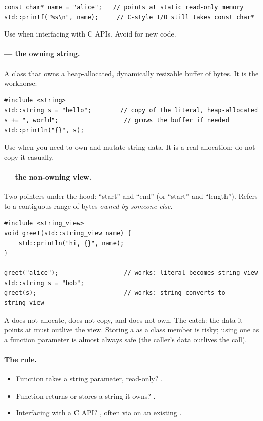 \begin{lstlisting}
const char* name = "alice";   // points at static read-only memory
std::printf("%s\n", name);     // C-style I/O still takes const char*
\end{lstlisting}

Use  when interfacing with C APIs. Avoid for new
\cpp{} code.

\paragraph{ --- the owning string.}
A class that owns a heap-allocated, dynamically resizable buffer of
bytes. It is the workhorse:

\begin{lstlisting}
#include <string>
std::string s = "hello";        // copy of the literal, heap-allocated
s += ", world";                  // grows the buffer if needed
std::println("{}", s);
\end{lstlisting}

Use  when you need to own and mutate string data.
It is a real allocation; do not copy it casually.

\paragraph{ --- the non-owning view.}
Two pointers under the hood: ``start'' and ``end'' (or ``start'' and
``length''). Refers to a contiguous range of bytes \emph{owned by
someone else}.

\begin{lstlisting}
#include <string_view>
void greet(std::string_view name) {
    std::println("hi, {}", name);
}

greet("alice");                  // works: literal becomes string_view
std::string s = "bob";
greet(s);                        // works: string converts to string_view
\end{lstlisting}

A  does not allocate, does not copy, and does not
own. The catch: the data it points at must outlive the view. Storing
a  as a class member is risky; using one as a
function parameter is almost always safe (the caller's data outlives
the call).

\paragraph{The rule.}
\begin{itemize}[leftmargin=*]
  \item Function takes a string parameter, read-only?
    .
  \item Function returns or stores a string it owns?
    .
  \item Interfacing with a C API? , often via
     on an existing .
\end{itemize}


